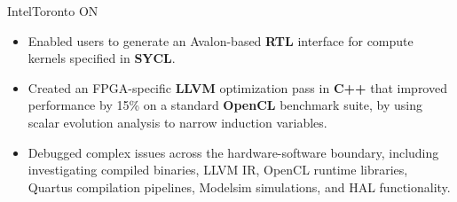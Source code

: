 \documentclass{moderncv}
\begin{document}
{Intel}{Toronto ON}{}
{\begin{itemize}
    \item Enabled users to generate an Avalon-based \textbf{RTL} interface for compute kernels specified in \textbf{SYCL}.
    \item Created an FPGA-specific \textbf{LLVM} optimization pass in \textbf{C++} that improved performance by 15\% on a standard \textbf{OpenCL} benchmark suite, by using scalar evolution analysis to narrow induction variables.
    \item Debugged complex issues across the hardware-software boundary, including investigating compiled binaries, LLVM IR, OpenCL runtime libraries, Quartus compilation pipelines, Modelsim simulations, and HAL functionality.
\end{itemize}}

\begin{comment}
\cventry{Sep 2022 - Dec 2022}{SQL Compiler Engineer (Co-op)}{Snowflake}{San Mateo CA}{}
{\begin{itemize}
    \item Developed data privacy features at the \textbf{SQL} query engine level for Snowflake's cloud database platform.
    \item Added rules to an \textbf{ANTLR 3} grammar to enable managing data aggregation policies in \textbf{SQL}, enabling customers to share data while maintaining their users' privacy.
    \item Implemented compiler changes in \textbf{Java} to parse and generate code for applying policies to a table.
    \item Implemented changes to a custom \textbf{FoundationDB} layer to store information about policies.
\end{itemize}}
\end{comment}

\begin{comment}
Snowflake1: Aggregation Policy Parser Stuff
basically, added a new type of policy which is an SQL object
it had to be added to the parser through an ANTLR grammar
but there was an issue with the way the grammar was factored into sub-grammars
so I had to inspect generated code and eventually refactor the root rules
into subrules in separate files
    rootparser.g:
        rule -> rule1 | rule2 | rule3;
    rules1.g:
        rule1 -> [...]
        rule2 -> [...]
    rules2.g:
        rule3 -> [...]
became
    rootparser.g:
        rule -> rules1 | rules2
    rules1.g:
        rules1 -> rule1 | rule2
        rule1 -> [...]
        rule2 -> [...]
    rules2.g:
        rule3 -> [...]
and then i was able to implement the rules for that type of policy
\end{comment}
\end{document}
